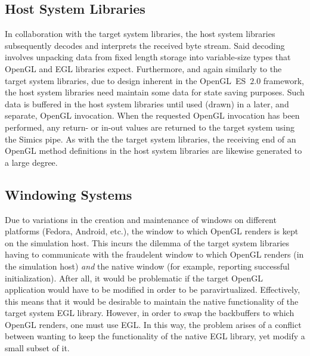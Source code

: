 
\subsection{Host System Libraries}
\label{sec:proposedsolutionandimplementation_hostsystemlibraries}
In collaboration with the target system libraries, the host system libraries subsequently decodes and interprets the received byte stream.
Said decoding involves unpacking data from fixed length storage into variable-size types that OpenGL and EGL libraries expect.
Furthermore, and again similarly to the target system libraries, due to design inherent in the OpenGL~ES~$2.0$ framework, the host system libraries need maintain some data for state saving purposes.
Such data is buffered in the host system libraries until used (drawn) in a later, and separate, OpenGL invocation.
When the requested OpenGL invocation has been performed, any return- or in-out values are returned to the target system using the Simics pipe.
As with the the target system libraries, the receiving end of an OpenGL method definitions in the host system libraries are likewise generated to a large degree.

\subsection{Windowing Systems}
\label{sec:proposedsolutionandimplementation_windowingsystems}
Due to variations in the creation and maintenance of windows on different platforms (Fedora, Android, etc.), the window to which OpenGL renders is kept on the simulation host.
This incurs the dilemma of the target system libraries having to communicate with the fraudelent window to which OpenGL renders (in the simulation host) \textit{and} the native window (for example, reporting successful initialization).
After all, it would be problematic if the target OpenGL application would have to be modified in order to be paravirtualized.
Effectively, this means that it would be desirable to maintain the native functionality of the target system EGL library.
However, in order to swap the backbuffers to which OpenGL renders, one must use EGL.
In this way, the problem arises of a conflict between wanting to keep the functionality of the native EGL library, yet modify a small subset of it.
 
